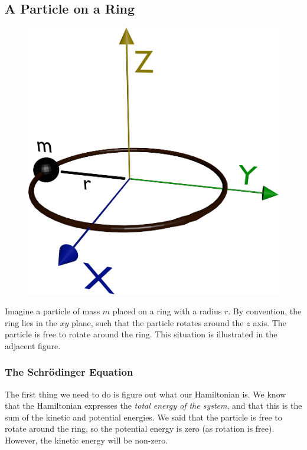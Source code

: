 \documentclass{memoir}[11pt,oneside,a4paper,openany]
\begin{document}
\subsection{A Particle on a Ring}
\begin{figure}
	\centering
	\includegraphics[width=\linewidth]{particle_on_a_ring}
\end{figure}
Imagine a particle of mass $m$ placed on a ring with a radius $r$. By convention, the ring lies in the $xy$ plane, such that the particle rotates around the $z$ axis. The particle is free to rotate around the ring. This situation is illustrated in the adjacent figure.

\subsubsection{The Schr{\"o}dinger Equation}
The first thing we need to do is figure out what our Hamiltonian is. We know that the Hamiltonian expresses the \emph{total energy of the system}, and that this is the sum of the kinetic and potential energies. We said that the particle is free to rotate around the ring, so the potential energy is zero (as rotation is free). However, the kinetic energy will be non-zero. 
\end{document}
